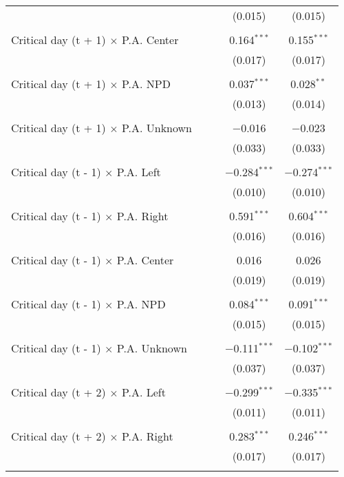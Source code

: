 \documentclass[
]{article}
\begin{document}
\begin{table}[!htbp]
{\begin{tabular}{@{\extracolsep{5pt}}lcccc}
  &  &  & (0.015) & (0.015) \\ 
  & & & & \\ 
 Critical day (t + 1) $\times$ P.A. Center &  &  & 0.164$^{***}$ & 0.155$^{***}$ \\ 
  &  &  & (0.017) & (0.017) \\ 
  & & & & \\ 
 Critical day (t + 1) $\times$ P.A. NPD &  &  & 0.037$^{***}$ & 0.028$^{**}$ \\ 
  &  &  & (0.013) & (0.014) \\ 
  & & & & \\ 
 Critical day (t + 1) $\times$ P.A. Unknown &  &  & $-$0.016 & $-$0.023 \\ 
  &  &  & (0.033) & (0.033) \\ 
  & & & & \\ 
 Critical day (t - 1) $\times$ P.A. Left &  &  & $-$0.284$^{***}$ & $-$0.274$^{***}$ \\ 
  &  &  & (0.010) & (0.010) \\ 
  & & & & \\ 
 Critical day (t - 1) $\times$ P.A. Right &  &  & 0.591$^{***}$ & 0.604$^{***}$ \\ 
  &  &  & (0.016) & (0.016) \\ 
  & & & & \\ 
 Critical day (t - 1) $\times$ P.A. Center &  &  & 0.016 & 0.026 \\ 
  &  &  & (0.019) & (0.019) \\ 
  & & & & \\ 
 Critical day (t - 1) $\times$ P.A. NPD &  &  & 0.084$^{***}$ & 0.091$^{***}$ \\ 
  &  &  & (0.015) & (0.015) \\ 
  & & & & \\ 
 Critical day (t - 1) $\times$ P.A. Unknown &  &  & $-$0.111$^{***}$ & $-$0.102$^{***}$ \\ 
  &  &  & (0.037) & (0.037) \\ 
  & & & & \\ 
 Critical day (t + 2) $\times$ P.A. Left &  &  & $-$0.299$^{***}$ & $-$0.335$^{***}$ \\ 
  &  &  & (0.011) & (0.011) \\ 
  & & & & \\ 
 Critical day (t + 2) $\times$ P.A. Right &  &  & 0.283$^{***}$ & 0.246$^{***}$ \\ 
  &  &  & (0.017) & (0.017) \\ 
  & & & & \\ 

\end{tabular}}
\end{table}
\end{document}

